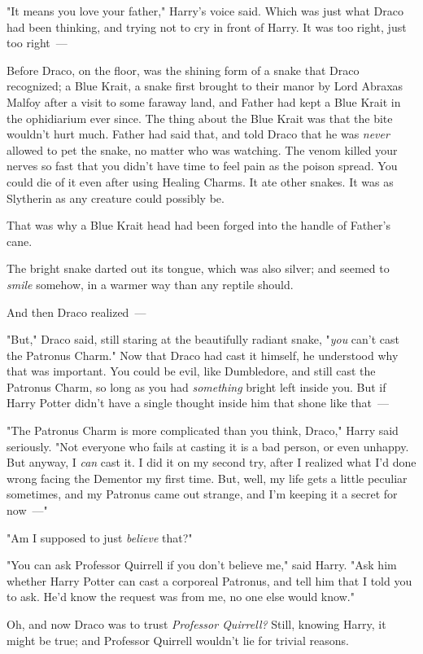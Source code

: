"It means you love your father," Harry's voice said. Which was just what Draco
had been thinking, and trying not to cry in front of Harry. It was too right,
just too right~---

Before Draco, on the floor, was the shining form of a snake that Draco
recognized; a Blue Krait, a snake first brought to their manor by Lord Abraxas
Malfoy after a visit to some faraway land, and Father had kept a Blue Krait in
the ophidiarium ever since. The thing about the Blue Krait was that the bite
wouldn't hurt much. Father had said that, and told Draco that he was
\emph{never} allowed to pet the snake, no matter who was watching. The venom
killed your nerves so fast that you didn't have time to feel pain as the poison
spread. You could die of it even after using Healing Charms. It ate other
snakes. It was as Slytherin as any creature could possibly be.

That was why a Blue Krait head had been forged into the handle of Father's cane.

The bright snake darted out its tongue, which was also silver; and seemed to
\emph{smile} somehow, in a warmer way than any reptile should.

And then Draco realized~---

"But," Draco said, still staring at the beautifully radiant snake, "\emph{you}
can't cast the Patronus Charm." Now that Draco had cast it himself, he
understood why that was important. You could be evil, like Dumbledore, and
still cast the Patronus Charm, so long as you had \emph{something} bright left
inside you. But if Harry Potter didn't have a single thought inside him that
shone like that~---

"The Patronus Charm is more complicated than you think, Draco," Harry said
seriously. "Not everyone who fails at casting it is a bad person, or even
unhappy. But anyway, I \emph{can} cast it. I did it on my second try, after I
realized what I'd done wrong facing the Dementor my first time. But, well, my
life gets a little peculiar sometimes, and my Patronus came out strange, and
I'm keeping it a secret for now~---"

"Am I supposed to just \emph{believe} that?"

"You can ask Professor Quirrell if you don't believe me," said Harry. "Ask him
whether Harry Potter can cast a corporeal Patronus, and tell him that I told
you to ask. He'd know the request was from me, no one else would know."

Oh, and now Draco was to trust \emph{Professor Quirrell?} Still, knowing Harry,
it might be true; and Professor Quirrell wouldn't lie for trivial reasons.

